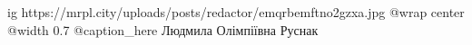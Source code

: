  
 
 
 
 

\ifcmt
  ig https://mrpl.city/uploads/posts/redactor/emqrbemftno2gzxa.jpg
  @wrap center
  @width 0.7
	@caption_here Людмила Олімпіївна Руснак
\fi
